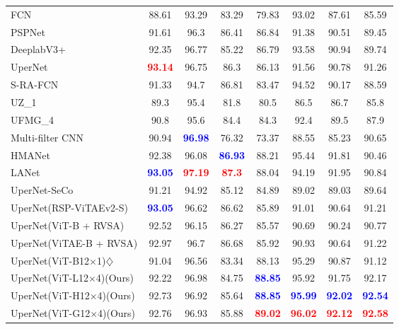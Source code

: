 \begin{table*}[t]{\textwidth=0mm}
{\begin{tabular}{l|c c c c c | c | c}
        FCN \cite{long2015fully} & 88.61 & 93.29 & 83.29 & 79.83 & 93.02 & 87.61 & 85.59 \\
        PSPNet \cite{zhao2017pyramid} & 91.61 & 96.3 & 86.41 & 86.84 & 91.38 & 90.51 & 89.45 \\
        DeeplabV3+ \cite{chen2018encoder} & 92.35 & 96.77 & 85.22 & 86.79 & 93.58 & 90.94 & 89.74 \\
        UperNet \cite{xiao2018unified} & \textbf{\textcolor{red}{93.14}} & 96.75 & 86.3 & 86.13 & 91.56 & 90.78 & 91.26 \\
        S-RA-FCN \cite{mou2020relation} & 91.33 & 94.7 & 86.81 & 83.47 & 94.52 & 90.17 & 88.59 \\ 
        UZ\_1 \cite{volpi2016dense}& 89.3 & 95.4 & 81.8 & 80.5 & 86.5 & 86.7 & 85.8 \\
        UFMG\_4 \cite{nogueira2019dynamic}& 90.8 & 95.6 & 84.4 & 84.3 & 92.4 & 89.5 & 87.9 \\
        Multi-filter CNN \cite{sun2018developing} & 90.94 & \textbf{\textcolor{blue}{96.98}} & 76.32 & 73.37 & 88.55 & 85.23 & 90.65 \\
        HMANet \cite{niu2021hybrid}& 92.38 & 96.08 & \textbf{\textcolor{blue}{86.93}} & 88.21 & 95.44 & 91.81 & 90.46 \\
        LANet \cite{ding2020lanet} & \textbf{\textcolor{blue}{93.05}} & \textbf{\textcolor{red}{97.19}} & \textbf{\textcolor{red}{87.3}} & 88.04 & 94.19 & 91.95 & 90.84 \\
        UperNet-SeCo \cite{manas2021seasonal} & 91.21 & 94.92 & 85.12 & 84.89 & 89.02 & 89.03 & 89.64 \\
        UperNet(RSP-ViTAEv2-S) \cite{wang2022empirical} & \textbf{\textcolor{blue}{93.05}} & 96.62 & 86.62 & 85.89 & 91.01 & 90.64 & 91.21 \\
        UperNet(ViT-B + RVSA) \cite{wang2022advancing} & 92.52 & 96.15 & 86.27 & 85.57 & 90.69 & 90.24 & 90.77 \\
        UperNet(ViTAE-B + RVSA) \cite{wang2022advancing} & 92.97 & 96.7 & 86.68 & 85.92 & 90.93 & 90.64 & 91.22 \\ \hline
        UperNet(ViT-B12$\times$1)$\diamondsuit$\cite{wang2022advancing} & 91.04 & 96.56 & 83.34 & 88.13 & 95.29 & 90.87 & 91.12 \\
        UperNet(ViT-L12$\times$4)(Ours) & 92.22 & 96.98 & 84.75 & \textbf{\textcolor{blue}{88.85}} & 95.92 & 91.75 & 92.17 \\
        UperNet(ViT-H12$\times$4)(Ours) & 92.73 & 96.92 & 85.64 & \textbf{\textcolor{blue}{88.85}} & \textbf{\textcolor{blue}{95.99}} & \textbf{\textcolor{blue}{92.02}} & \textbf{\textcolor{blue}{92.54}} \\
        UperNet(ViT-G12$\times$4)(Ours) & 92.76 & 96.93 & 85.88 & \textbf{\textcolor{red}{89.02}} & \textbf{\textcolor{red}{96.02}} & \textbf{\textcolor{red}{92.12}} & \textbf{\textcolor{red}{92.58}} \\ \hline
       


\end{tabular}}
\end{table*}
